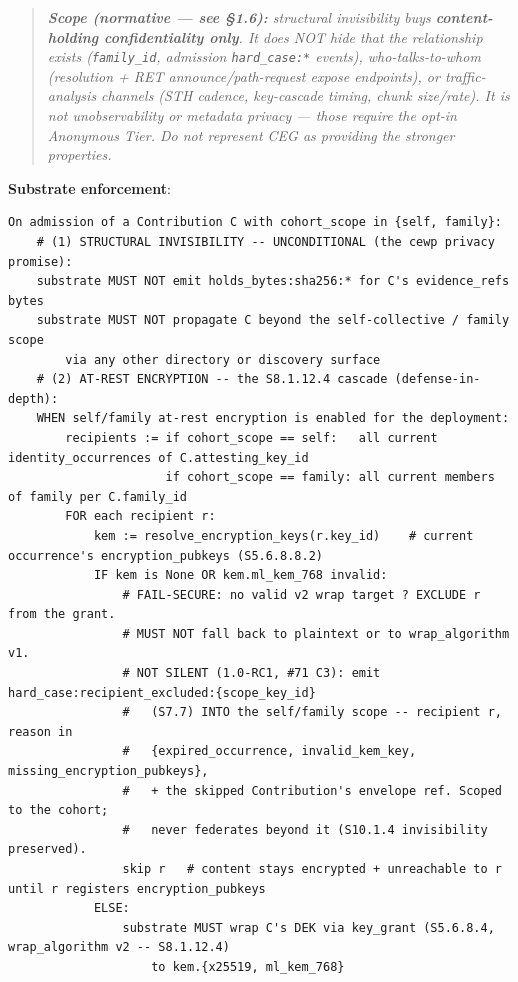 \documentclass[10pt]{article}
\begin{document}
\begin{quote}\itshape \textbf{Scope (normative — see §1.6):} structural invisibility buys \textbf{content-holding confidentiality only}. It does NOT hide that the relationship exists (\texttt{family\_id}, admission \texttt{hard\_case:*} events), who-talks-to-whom (resolution + RET announce/path-request expose endpoints), or traffic-analysis channels (STH cadence, key-cascade timing, chunk size/rate). It is not unobservability or metadata privacy — those require the opt-in Anonymous Tier. Do not represent CEG as providing the stronger properties.\end{quote}


\textbf{Substrate enforcement}:


\begin{lstlisting}
On admission of a Contribution C with cohort_scope in {self, family}:
    # (1) STRUCTURAL INVISIBILITY -- UNCONDITIONAL (the cewp privacy promise):
    substrate MUST NOT emit holds_bytes:sha256:* for C's evidence_refs bytes
    substrate MUST NOT propagate C beyond the self-collective / family scope
        via any other directory or discovery surface
    # (2) AT-REST ENCRYPTION -- the S8.1.12.4 cascade (defense-in-depth):
    WHEN self/family at-rest encryption is enabled for the deployment:
        recipients := if cohort_scope == self:   all current identity_occurrences of C.attesting_key_id
                      if cohort_scope == family: all current members of family per C.family_id
        FOR each recipient r:
            kem := resolve_encryption_keys(r.key_id)    # current occurrence's encryption_pubkeys (S5.6.8.8.2)
            IF kem is None OR kem.ml_kem_768 invalid:
                # FAIL-SECURE: no valid v2 wrap target ? EXCLUDE r from the grant.
                # MUST NOT fall back to plaintext or to wrap_algorithm v1.
                # NOT SILENT (1.0-RC1, #71 C3): emit hard_case:recipient_excluded:{scope_key_id}
                #   (S7.7) INTO the self/family scope -- recipient r, reason in
                #   {expired_occurrence, invalid_kem_key, missing_encryption_pubkeys},
                #   + the skipped Contribution's envelope ref. Scoped to the cohort;
                #   never federates beyond it (S10.1.4 invisibility preserved).
                skip r   # content stays encrypted + unreachable to r until r registers encryption_pubkeys
            ELSE:
                substrate MUST wrap C's DEK via key_grant (S5.6.8.4, wrap_algorithm v2 -- S8.1.12.4)
                    to kem.{x25519, ml_kem_768}
\end{lstlisting}
\end{document}
